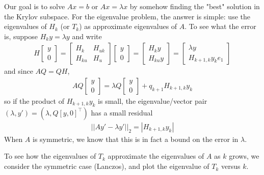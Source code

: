 \documentclass[11pt]{article}
\numberwithin{equation}{section}
\begin{document}
Our goal is to solve $Ax=b$ or $Ax = \lambda x$ by somehow finding the "best" solution in the Krylov subspace. For the eigenvalue problem, the answer is simple: 
use the eigenvalues of $H_k$ (or $T_k$) as approximate eigenvalues of $A$. To see what the error is, suppose $H_k y = \lambda y$ and write \begin{align*}
    H \left[ \begin{array}{cc}
        y \\ 0
    \end{array} \right]  = \left[\begin{array}{ll}
        H_{k} & H_{u k} \\
        H_{ku} & H_{u}
        \end{array}\right]\left[ \begin{array}{cc}
            y \\ 0
        \end{array} \right] = \left[ \begin{array}{cc}
            H_k y \\ H_{ku}y
        \end{array} \right] = \left[ \begin{array}{cc}
            \lambda y \\ H_{k+1, k} y_k e_1
        \end{array} \right]
\end{align*}
and since $AQ = QH$, \begin{align*}
    A Q\left[ \begin{array}{cc}
        y \\ 0
    \end{array} \right]  = \lambda Q\left[ \begin{array}{cc}
        y \\ 0
    \end{array} \right] + q_{k+1} H_{k+1, k} y_k
\end{align*}
so if the product of $H_{k+1, k} y_k$ is small, the eigenvalue/vector pair $(\lambda, y') = (\lambda, Q[y, 0]^\top)$ has a small residual \begin{align*}
    || Ay' - \lambda y' ||_2 = |H_{k+1, k} y_k|
\end{align*}
When $A$ is symmetric, we know that this is in fact a bound on the error in $\lambda$.

To see how the eigenvalues of $T_k$ approximate the eigenvalues of $A$ as $k$ grows, we consider the symmetric case (Lanczos), 
and plot the eigenvalue of $T_k$ versus $k$.
\end{document}
